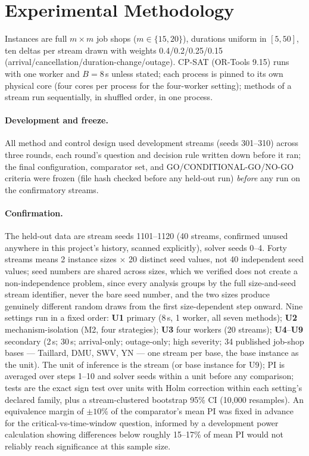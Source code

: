 \documentclass[letterpaper]{article} %
\begin{document}
\section{Experimental Methodology}

Instances are full $m\times m$ job shops ($m\in\{15,20\}$), durations uniform in $[5,50]$, ten deltas per stream drawn with weights 0.4/0.2/0.25/0.15 (arrival/cancellation/duration-change/outage). CP-SAT (OR-Tools 9.15) runs with one worker and $B=8$\,s unless stated; each process is pinned to its own physical core (four cores per process for the four-worker setting); methods of a stream run sequentially, in shuffled order, in one process.

\paragraph{Development and freeze.} All method and control design used development streams (seeds 301--310) across three rounds, each round's question and decision rule written down before it ran; the final configuration, comparator set, and GO/CONDITIONAL-GO/NO-GO criteria were frozen (file hash checked before any held-out run) \emph{before} any run on the confirmatory streams.

\paragraph{Confirmation.} The held-out data are stream seeds 1101--1120 (40 streams, confirmed unused anywhere in this project's history, scanned explicitly), solver seeds 0--4. Forty streams means 2 instance sizes $\times$ 20 distinct seed values, not 40 independent seed values; seed numbers are shared across sizes, which we verified does not create a non-independence problem, since every analysis groups by the full size-and-seed stream identifier, never the bare seed number, and the two sizes produce genuinely different random draws from the first size-dependent step onward. Nine settings run in a fixed order: \textbf{U1} primary (8\,s, 1 worker, all seven methods); \textbf{U2} mechanism-isolation (M2, four strategies); \textbf{U3} four workers (20 streams); \textbf{U4}--\textbf{U9} secondary (2\,s; 30\,s; arrival-only; outage-only; high severity; 34 published job-shop bases --- Taillard, DMU, SWV, YN --- one stream per base, the base instance as the unit). The unit of inference is the stream (or base instance for U9); PI is averaged over steps 1--10 and solver seeds within a unit before any comparison; tests are the exact sign test over units with Holm correction within each setting's declared family, plus a stream-clustered bootstrap 95\% CI (10{,}000 resamples). An equivalence margin of $\pm10\%$ of the comparator's mean PI was fixed in advance for the critical-vs-time-window question, informed by a development power calculation showing differences below roughly 15--17\% of mean PI would not reliably reach significance at this sample size.
\end{document}

